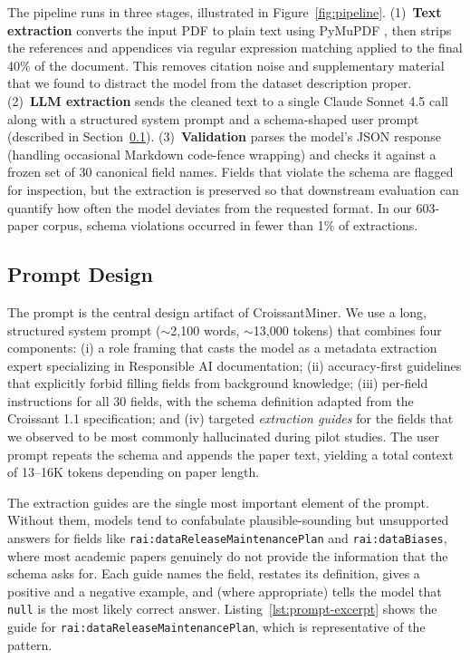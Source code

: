 The pipeline runs in three stages, illustrated in Figure~\ref{fig:pipeline}. (1)~\textbf{Text extraction} converts the input PDF to plain text using PyMuPDF \cite{pymupdf}, then strips the references and appendices via regular expression matching applied to the final 40\% of the document. This removes citation noise and supplementary material that we found to distract the model from the dataset description proper. (2)~\textbf{LLM extraction} sends the cleaned text to a single Claude Sonnet 4.5 call along with a structured system prompt and a schema-shaped user prompt (described in Section~\ref{sec:prompt-design}). (3)~\textbf{Validation} parses the model's JSON response (handling occasional Markdown code-fence wrapping) and checks it against a frozen set of 30 canonical field names. Fields that violate the schema are flagged for inspection, but the extraction is preserved so that downstream evaluation can quantify how often the model deviates from the requested format. In our 603-paper corpus, schema violations occurred in fewer than 1\% of extractions.

\subsection{Prompt Design}
\label{sec:prompt-design}

The prompt is the central design artifact of CroissantMiner. We use a long, structured system prompt ($\sim$2{,}100 words, $\sim$13{,}000 tokens) that combines four components: (i) a role framing that casts the model as a metadata extraction expert specializing in Responsible AI documentation; (ii) accuracy-first guidelines that explicitly forbid filling fields from background knowledge; (iii) per-field instructions for all 30 fields, with the schema definition adapted from the Croissant 1.1 specification; and (iv) targeted \emph{extraction guides} for the fields that we observed to be most commonly hallucinated during pilot studies. The user prompt repeats the schema and appends the paper text, yielding a total context of 13--16K tokens depending on paper length.

The extraction guides are the single most important element of the prompt. Without them, models tend to confabulate plausible-sounding but unsupported answers for fields like \texttt{rai:dataReleaseMaintenancePlan} and \texttt{rai:dataBiases}, where most academic papers genuinely do not provide the information that the schema asks for. Each guide names the field, restates its definition, gives a positive and a negative example, and (where appropriate) tells the model that \texttt{null} is the most likely correct answer. Listing~\ref{lst:prompt-excerpt} shows the guide for \texttt{rai:dataReleaseMaintenancePlan}, which is representative of the pattern.

